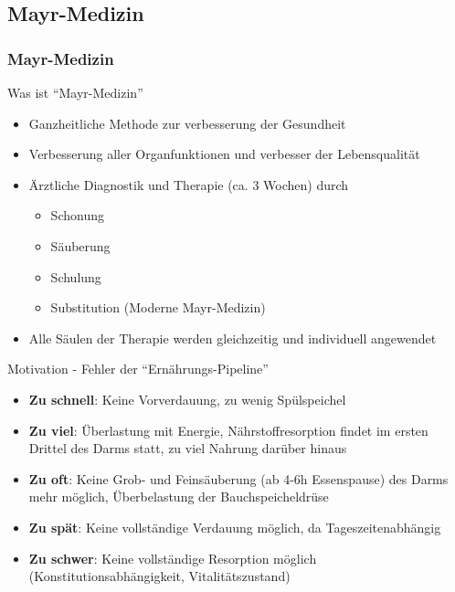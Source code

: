 \documentclass[xcolor=dvipsnames]{beamer}
\begin{document}
    \subsection{Mayr-Medizin}
    \begin{frame}[allowframebreaks]
        \frametitle{Mayr-Medizin}

        \begin{block}{Was ist "`Mayr-Medizin"'}
            \begin{itemize}
                \setlength\itemsep{1em}
                \item Ganzheitliche Methode zur verbesserung der Gesundheit
                \item Verbesserung aller Organfunktionen und verbesser der Lebensqualität
                \item Ärztliche Diagnostik und Therapie (ca. 3 Wochen) durch
                \begin{itemize}
                    \item Schonung
                    \item Säuberung
                    \item Schulung
                    \item Substitution (Moderne Mayr-Medizin)
                \end{itemize}
                \item Alle Säulen der Therapie werden gleichzeitig und individuell angewendet
            \end{itemize}
        \end{block}

        \begin{block}{Motivation - Fehler der "`Ernährungs-Pipeline"'}
            \begin{itemize}
                \setlength\itemsep{1em}
                \item \textbf{Zu schnell}: Keine Vorverdauung, zu wenig Spülspeichel
                \item \textbf{Zu viel}: Überlastung mit Energie, Nährstoffresorption findet im ersten Drittel des Darms statt, zu viel Nahrung darüber hinaus
                \item \textbf{Zu oft}: Keine Grob- und Feinsäuberung (ab 4-6h Essenspause) des Darms mehr möglich, Überbelastung der Bauchspeicheldrüse
                \item \textbf{Zu spät}: Keine vollständige Verdauung möglich, da Tageszeitenabhängig
                \item \textbf{Zu schwer}: Keine vollständige Resorption möglich (Konstitutionsabhängigkeit, Vitalitätszustand)
            \end{itemize}
        \end{block}


\end{frame}
\end{document}
